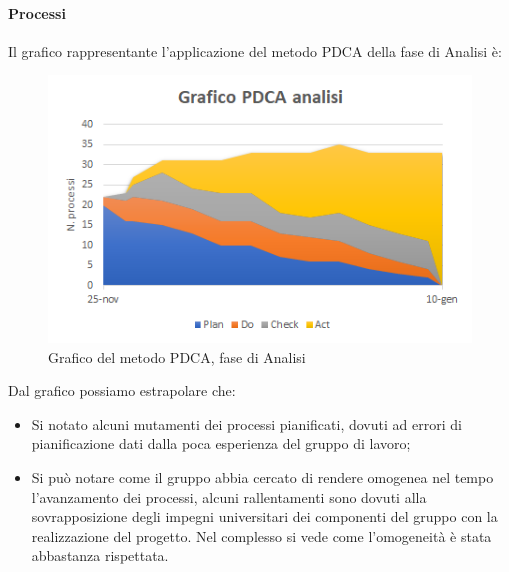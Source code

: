 \paragraph{Processi} \Spazio
Il grafico rappresentante l'applicazione del metodo PDCA della fase di Analisi è:
\begin{figure} [H]
	\centering
	\includegraphics[scale=1]{Img/Grafico_PDCA}
	\caption{Grafico del metodo PDCA, fase di Analisi}\label{}
\end{figure}
Dal grafico possiamo estrapolare che:
\begin{itemize}
	\item Si notato alcuni mutamenti dei processi pianificati, dovuti ad errori di pianificazione dati dalla poca esperienza del gruppo di lavoro;
	\item Si può notare come il gruppo abbia cercato di rendere omogenea nel tempo l'avanzamento dei processi, alcuni rallentamenti sono dovuti alla sovrapposizione degli impegni
	universitari dei componenti del gruppo con la realizzazione del progetto. Nel complesso si vede come l'omogeneità è stata abbastanza rispettata.
\end{itemize}
